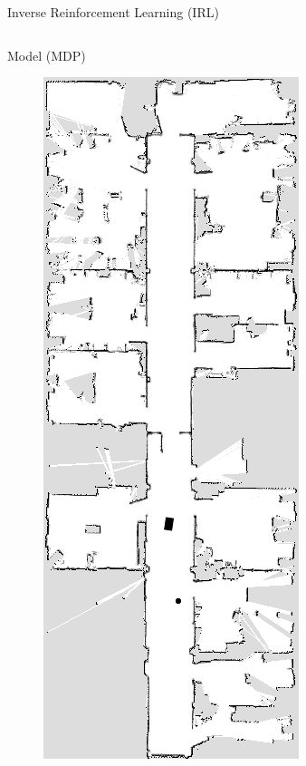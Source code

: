 \documentclass{beamer}
\begin{document}
\begin{frame}{Inverse Reinforcement Learning (IRL)}
  \begin{columns}
    \begin{column}{0.2\textwidth}
      Model (MDP)
      \begin{figure}
        \centering
        \includegraphics[width=\textwidth]{images/image-052.png}

\end{figure}
\end{column}
\end{columns}
\end{frame}
\end{document}
